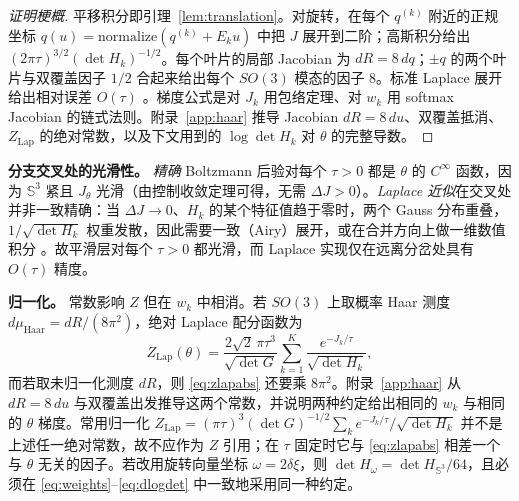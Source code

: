 \begin{proof}[证明梗概]
平移积分即引理~\ref{lem:translation}。对旋转，在每个 $q^{(k)}$ 附近的正规坐标 $q(u)=\mathrm{normalize}(q^{(k)}+E_ku)$ 中把 $J$ 展开到二阶；高斯积分给出 $(2\pi\tau)^{3/2}(\det H_k)^{-1/2}$。每个叶片的局部 Jacobian 为 $dR=8\,dq$；$\pm q$ 的两个叶片与双覆盖因子 $1/2$ 合起来给出每个 $SO(3)$ 模态的因子 $8$。标准 Laplace 展开给出相对误差 $O(\tau)$ \cite{bleistein1986,wong1989}。梯度公式是对 $J_k$ 用包络定理、对 $w_k$ 用 softmax Jacobian 的链式法则。附录~\ref{app:haar} 推导 Jacobian $dR=8\,du$、双覆盖抵消、$Z_{\mathrm{Lap}}$ 的绝对常数，以及下文用到的 $\log\det H_k$ 对 $\theta$ 的完整导数。
\end{proof}

\textbf{分支交叉处的光滑性。} \emph{精确} Boltzmann 后验对每个 $\tau>0$ 都是 $\theta$ 的 $C^\infty$ 函数，因为 $\mathbb{S}^3$ 紧且 $J_\theta$ 光滑（由控制收敛定理可得，无需 $\Delta J>0$）。\emph{Laplace 近似}在交叉处并非一致精确：当 $\Delta J\to0$、$H_k$ 的某个特征值趋于零时，两个 Gauss 分布重叠，$1/\sqrt{\det H_k}$ 权重发散，因此需要一致（Airy）展开，或在合并方向上做一维数值积分 \cite{bleistein1986}。故平滑层对每个 $\tau>0$ 都光滑，而 Laplace 实现仅在远离分岔处具有 $O(\tau)$ 精度。

\textbf{归一化。} 常数影响 $Z$ 但在 $w_k$ 中相消。若 $SO(3)$ 上取概率 Haar 测度 $d\mu_{\mathrm{Haar}}=dR/(8\pi^2)$，绝对 Laplace 配分函数为
\begin{equation}
Z_{\mathrm{Lap}}(\theta)=\frac{2\sqrt2\,\pi\tau^3}{\sqrt{\det G}}\sum_{k=1}^K\frac{e^{-J_k/\tau}}{\sqrt{\det H_k}},
\label{eq:zlapabs}
\end{equation}
而若取未归一化测度 $dR$，则 \eqref{eq:zlapabs} 还要乘 $8\pi^2$。附录~\ref{app:haar} 从 $dR=8\,du$ 与双覆盖出发推导这两个常数，并说明两种约定给出相同的 $w_k$ 与相同的 $\theta$ 梯度。常用归一化 $Z_{\mathrm{Lap}}=(\pi\tau)^3(\det G)^{-1/2}\sum_ke^{-J_k/\tau}/\sqrt{\det H_k}$ 并不是上述任一绝对常数，故不应作为 $Z$ 引用；在 $\tau$ 固定时它与 \eqref{eq:zlapabs} 相差一个与 $\theta$ 无关的因子。若改用旋转向量坐标 $\omega=2\delta\xi$，则 $\det H_\omega=\det H_{\mathbb{S}^3}/64$，且必须在 \eqref{eq:weights}--\eqref{eq:dlogdet} 中一致地采用同一种约定。

